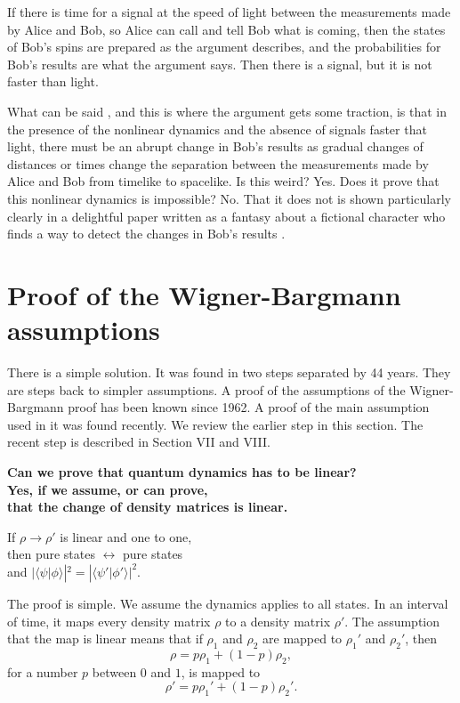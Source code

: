 \documentclass[pra, 12pt, showkeys, eqsecnum]{revtex4}
\begin{document}
If there is time for a signal at the speed of light between the measurements made by Alice and Bob, so Alice can call and tell Bob what is coming, then the states of Bob's spins are prepared as the argument describes, and the probabilities for Bob's results are what the argument says. Then there is a signal, but it is not faster than light.

What can be said \cite{me71,CzachorDoebner}, and this is where the argument gets some traction, is that in the presence of the nonlinear dynamics and the absence of signals faster that light, there must be an abrupt change in Bob's results as gradual changes of distances or times change the separation between the measurements made by Alice and Bob from timelike to spacelike. Is this weird? Yes. Does it prove that this nonlinear dynamics is impossible? No. That it does not is shown particularly clearly in a delightful paper written as a fantasy about a fictional character who finds a way to detect the changes in Bob's results \cite{Kent}.

\section{Proof of the Wigner-Bargmann assumptions}\label{five}

There is a simple solution. It was found in two steps separated by 44 years. They are steps back to simpler assumptions. A proof of the assumptions of the Wigner-Bargmann proof has been known\cite{jordan62,Kadison,Hunziker,Simon} since 1962. A proof of the main assumption used in it was found recently\cite{me80}. We review the earlier step in this section. The recent step is described in Section VII and VIII.

\bigskip
\large
\noindent
\textbf{Can we prove that quantum dynamics has to be linear? \\
Yes, if we assume, or can prove, \\ 
that the change of density matrices is linear.} \\
\begin{center}
\vspace{-0.8cm}
If $\rho \rightarrow \rho ' $  is linear and one to one, \\
then pure states  $\leftrightarrow $  pure states \\
and $|\langle\psi |\phi \rangle |^2  =  |\langle\psi '|\phi '\rangle |^2 $.
\end{center}
\normalsize

The proof is simple. We assume the dynamics applies to all states. In an interval of time, it maps every density matrix $\rho $ to a density matrix $\rho '$. The assumption that the map is linear means that if $\rho_1$ and $\rho_2$ are mapped to $\rho_1'$ and $\rho _2'$, then
\begin{equation}
\label{eq:ld2}
\rho = p\rho_{1} + (1-p)\rho_{2},
\end{equation}
for a number $p$ between $0$ and $1$, is mapped to
\begin{equation}
\label{eq:se1}
\rho ' = p\rho_1' + (1-p)\rho_2'.
\end{equation}
\end{document}
